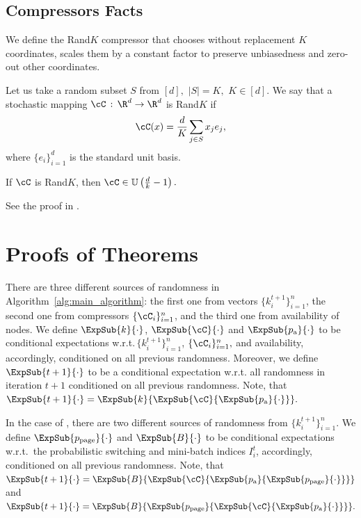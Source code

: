 \documentclass{article}
\newcommand{\algorithmname}{DASHA-PP}
\newcommand*{\probavailable}{\ensuremath{p_{\textnormal{a}}}}
\newcommand*{\probpage}{\ensuremath{p_{\text{page}}}}
\begin{document}
\subsection{Compressors Facts}

We define the Rand$K$ compressor that chooses without replacement $K$ coordinates, scales them by a constant factor to preserve unbiasedness and zero-out other coordinates.
\begin{definition}
    \label{def:rand_k}
    Let us take a random subset $S$ from $[d],$ $|S| = K,$ $K \in [d].$ We say that a stochastic mapping $\cC\,:\, \R^d \rightarrow \R^d$ is Rand$K$ if
    $$\cC(x) = \frac{d}{K} \sum_{j \in S} x_j e_j,$$ where $\{e_i\}_{i=1}^d$ is the standard unit basis.
\end{definition}

\begin{theorem}
    \label{theorem:rand_k}
    If $\cC$ is Rand$K$, then $\cC \in \mathbb{U}\left(\frac{d}{k} - 1\right).$
\end{theorem}
See the proof in \citep{beznosikov2020biased}.

\section{Proofs of Theorems}
\label{sec:proof_of_theorems}

There are three different sources of randomness in Algorithm~\ref{alg:main_algorithm}: the first one from vectors $\{k_i^{t+1}\}_{i=1}^n$, the second one from compressors $\{\cC_i\}_{i=1}^n$, and the third one from availability of nodes. We define $\ExpSub{k}{\cdot}$, $\ExpSub{\cC}{\cdot}$ and $\ExpSub{\probavailable}{\cdot}$ to be conditional expectations w.r.t.\,$\{k_i^{t+1}\}_{i=1}^n$, $\{\cC_i\}_{i=1}^n, $ and availability, accordingly, conditioned on all previous randomness. Moreover, we define $\ExpSub{t+1}{\cdot}$ to be a conditional expectation w.r.t. all randomness in iteration $t+1$ conditioned on all previous randomness. Note, that $\ExpSub{t+1}{\cdot} = \ExpSub{k}{\ExpSub{\cC}{\ExpSub{\probavailable}{\cdot}}}.$

In the case of \algname{\algorithmname-PAGE}, there are two different sources of randomness from $\{k_i^{t+1}\}_{i=1}^n$. We define $\ExpSub{\probpage}{\cdot}$ and $\ExpSub{B}{\cdot}$ to be conditional expectations w.r.t.\, the probabilistic switching and mini-batch indices $I_{i}^t$, accordingly, conditioned on all previous randomness. Note, that $\ExpSub{t+1}{\cdot} = \ExpSub{B}{\ExpSub{\cC}{\ExpSub{\probavailable}{\ExpSub{\probpage}{\cdot}}}}$ and $\ExpSub{t+1}{\cdot} = \ExpSub{B}{\ExpSub{\probpage}{\ExpSub{\cC}{\ExpSub{\probavailable}{\cdot}}}}.$
\end{document}
